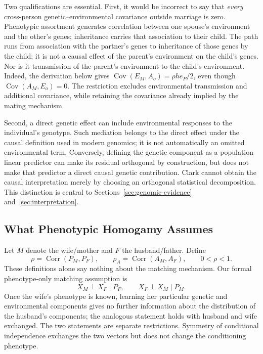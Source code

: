 Two qualifications are essential. First, it would be incorrect to say
that \emph{every} cross-person genetic--environmental covariance outside
marriage is zero. Phenotypic assortment generates correlation between one
spouse's environment and the other's genes; inheritance carries that
association to their child. The path runs from association with the
partner's genes to inheritance of those genes by the child; it is not a
causal effect of the parent's environment on the child's genes. Nor is it
transmission of the parent's environment to the child's environment.
Indeed, the derivation below gives
$\operatorname{Cov}(E_M,A_o)=\rho h e_P/2$, even though
$\operatorname{Cov}(A_M,E_o)=0$. The restriction excludes environmental
transmission and additional covariance, while retaining the covariance
already implied by the mating mechanism.

Second, a direct genetic effect can include environmental responses to
the individual's genotype. Such mediation belongs to the direct effect
under the causal definition used in modern genomics; it is not automatically
an omitted environmental term. Conversely, defining the genetic component
as a population linear predictor can make its residual orthogonal by
construction, but does not make that predictor a direct causal genetic
contribution. Clark cannot obtain the causal interpretation merely by
choosing an orthogonal statistical decomposition. This distinction is
central to Sections~\ref{sec:genomic-evidence} and~\ref{sec:interpretation}.

\subsection{What Phenotypic Homogamy Assumes}
\label{sec:model-ph}

Let $M$ denote the wife/mother and $F$ the husband/father. Define
\[
 \rho=\operatorname{Corr}(P_M,P_F),\qquad
 \rho_A=\operatorname{Corr}(A_M,A_F),\qquad 0<\rho<1.
\]
These definitions alone say nothing about the matching mechanism.
Our formal phenotype-only matching assumption is
\begin{equation}
 X_M\perp X_F\mid P_F,\qquad X_F\perp X_M\mid P_M.
 \tag{PH}\label{eq:model-ph}
\end{equation}
Once the wife's phenotype is known, learning her particular genetic and
environmental components gives no further information about the
distribution of the husband's components; the analogous statement holds
with husband and wife exchanged. The two statements are separate
restrictions. Symmetry of conditional independence exchanges the two
vectors but does not change the conditioning phenotype.

